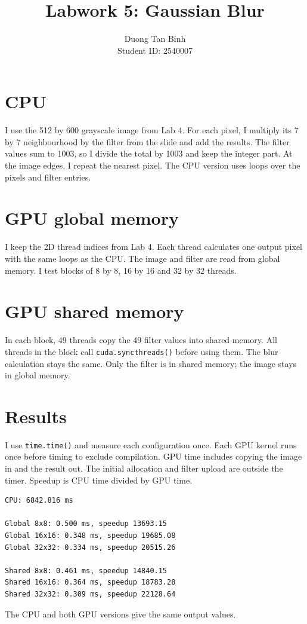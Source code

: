 \documentclass[11pt,a4paper]{article}
\title{Labwork 5: Gaussian Blur}
\author{Duong Tan Binh \\ Student ID: 2540007}
\date{}
\begin{document}
\maketitle

\section{CPU}
I use the 512 by 600 grayscale image from Lab 4.
For each pixel, I multiply its 7 by 7 neighbourhood by the filter
from the slide and add the results. The filter values sum to 1003,
so I divide the total by 1003 and keep the integer part.
At the image edges, I repeat the nearest pixel.
The CPU version uses loops over the pixels and filter entries.

\section{GPU global memory}
I keep the 2D thread indices from Lab 4. Each thread calculates
one output pixel with the same loops as the CPU.
The image and filter are read from global memory.
I test blocks of 8 by 8, 16 by 16 and 32 by 32 threads.

\section{GPU shared memory}
In each block, 49 threads copy the 49 filter values into shared memory.
All threads in the block call \texttt{cuda.syncthreads()} before using them.
The blur calculation stays the same. Only the filter is in shared memory;
the image stays in global memory.

\section{Results}
I use \texttt{time.time()} and measure each configuration once.
Each GPU kernel runs once before timing to exclude compilation.
GPU time includes copying the image in and the result out.
The initial allocation and filter upload are outside the timer.
Speedup is CPU time divided by GPU time.

\begin{verbatim}
CPU: 6842.816 ms

Global 8x8: 0.500 ms, speedup 13693.15
Global 16x16: 0.348 ms, speedup 19685.08
Global 32x32: 0.334 ms, speedup 20515.26

Shared 8x8: 0.461 ms, speedup 14840.15
Shared 16x16: 0.364 ms, speedup 18783.28
Shared 32x32: 0.309 ms, speedup 22128.64
\end{verbatim}
The CPU and both GPU versions give the same output values.
\end{document}
